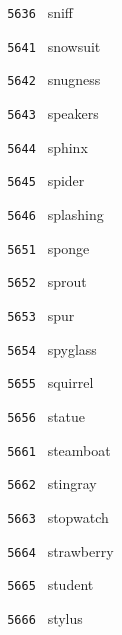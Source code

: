 \documentclass[11pt]{article}
\begin{document}
\begin{multicols}{6}
\noindent \texttt{ 5636 } sniff  \par
\noindent \texttt{ 5641 } snowsuit  \par
\noindent \texttt{ 5642 } snugness  \par
\noindent \texttt{ 5643 } speakers  \par
\noindent \texttt{ 5644 } sphinx  \par
\noindent \texttt{ 5645 } spider  \par
\noindent \texttt{ 5646 } splashing  \par
\noindent \texttt{ 5651 } sponge  \par
\noindent \texttt{ 5652 } sprout  \par
\noindent \texttt{ 5653 } spur  \par
\noindent \texttt{ 5654 } spyglass  \par
\noindent \texttt{ 5655 } squirrel  \par
\noindent \texttt{ 5656 } statue  \par
\noindent \texttt{ 5661 } steamboat  \par
\noindent \texttt{ 5662 } stingray  \par
\noindent \texttt{ 5663 } stopwatch  \par
\noindent \texttt{ 5664 } strawberry  \par
\noindent \texttt{ 5665 } student  \par
\noindent \texttt{ 5666 } stylus  \par
\end{multicols}
\end{document}
